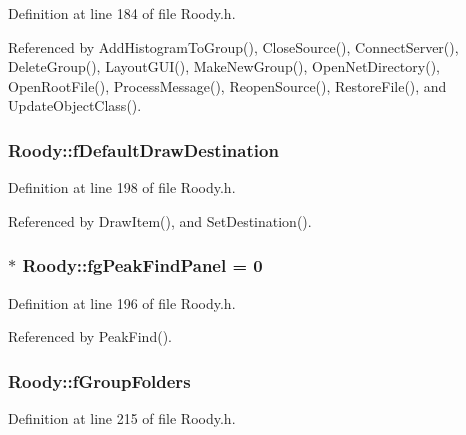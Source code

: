 Definition at line 184 of file Roody.h.



Referenced by AddHistogramToGroup(), CloseSource(), ConnectServer(), DeleteGroup(), LayoutGUI(), MakeNewGroup(), OpenNetDirectory(), OpenRootFile(), ProcessMessage(), ReopenSource(), RestoreFile(), and UpdateObjectClass().

\subsubsection[{fDefaultDrawDestination}]{ {\bf Roody::fDefaultDrawDestination}\hspace{0.3cm}{\ttfamily  [private]}}\label{classRoody_a85f7442dcfb56450d8aa7eb6f21690e1}


Definition at line 198 of file Roody.h.



Referenced by DrawItem(), and SetDestination().

\subsubsection[{fgPeakFindPanel}]{ $\ast$ {\bf Roody::fgPeakFindPanel} = 0\hspace{0.3cm}{\ttfamily  [static, private]}}\label{classRoody_a77bfde3c103b507e1692f9587b93ff47}


Definition at line 196 of file Roody.h.



Referenced by PeakFind().

\subsubsection[{fGroupFolders}]{ {\bf Roody::fGroupFolders}\hspace{0.3cm}{\ttfamily  [private]}}\label{classRoody_a61aeb013dc199a8ed4fd57e140adab6a}


Definition at line 215 of file Roody.h.




